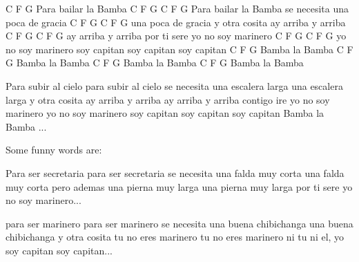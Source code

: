 
               C    F G
Para bailar la Bamba
               C        F    G                C    F G
Para bailar la Bamba se necesita una poca de gracia
             C        F     G                   C   F G
una poca de gracia y otra cosita ay arriba y arriba
               C       F     G                C   F G
ay arriba y arriba por ti sere yo no soy marinero
               C        F    G          C       F   G
yo no soy marinero soy capitan soy capitan soy capitan
C   F     G
Bamba la Bamba
C   F     G
Bamba la Bamba
C   F     G
Bamba la Bamba
C   F     G
Bamba la Bamba

Para subir al cielo
para subir al cielo se necesita una escalera larga
una escalera larga y otra cosita ay arriba y arriba
ay arriba y arriba contigo ire yo no soy marinero
yo no soy marinero soy capitan soy capitan soy capitan
Bamba la Bamba ...

Some funny words are:

Para ser secretaria
para ser secretaria se necesita una falda muy corta
una falda muy corta pero ademas una pierna muy larga
una pierna muy larga por ti sere yo no soy marinero...

para ser marinero
para ser marinero se necesita una buena chibichanga
una buena chibichanga y otra cosita tu no eres marinero
tu no eres marinero ni tu ni el, yo soy capitan soy capitan...